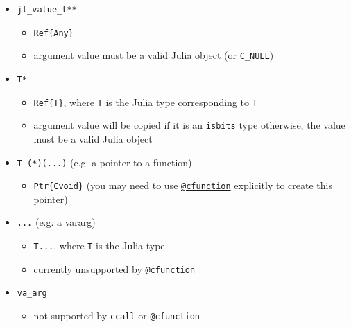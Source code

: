 \begin{itemize}
\begin{itemize}
\end{itemize}

\item \texttt{jl\_value\_t**}

\begin{itemize}
\item \texttt{Ref\{Any\}}


\item argument value must be a valid Julia object (or \texttt{C\_NULL})

\end{itemize}

\item \texttt{T*}

\begin{itemize}
\item \texttt{Ref\{T\}}, where \texttt{T} is the Julia type corresponding to \texttt{T}


\item argument value will be copied if it is an \texttt{isbits} type otherwise, the value must be a valid Julia object

\end{itemize}

\item \texttt{T (*)(...)} (e.g. a pointer to a function)

\begin{itemize}
\item \texttt{Ptr\{Cvoid\}} (you may need to use \hyperlink{11617107520401351255}{\texttt{@cfunction}} explicitly to create this pointer)

\end{itemize}

\item \texttt{...} (e.g. a vararg)

\begin{itemize}
\item \texttt{T...}, where \texttt{T} is the Julia type


\item currently unsupported by \texttt{@cfunction}

\end{itemize}

\item \texttt{va\_arg}

\begin{itemize}
\item not supported by \texttt{ccall} or \texttt{@cfunction}

\end{itemize}
\end{itemize}


